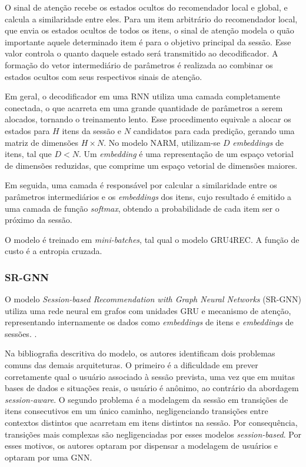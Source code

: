 O sinal de atenção recebe os estados ocultos do recomendador local e global, e
calcula a similaridade entre eles. Para um item arbitrário do recomendador local, que envia os estados ocultos de
todos os itens, o sinal de atenção modela o quão importante aquele determinado
item é para o objetivo principal da sessão. Esse valor controla o quanto daquele
estado será transmitido ao decodificador. A formação do vetor intermediário de
parâmetros é realizada ao combinar os estados ocultos com seus respectivos
sinais de atenção.

Em geral, o decodificador em uma RNN utiliza uma camada completamente conectada,
o que acarreta em uma grande quantidade de parâmetros a serem alocados, tornando
o treinamento lento. Esse procedimento equivale a alocar os estados para $H$
itens da sessão e $N$ candidatos para cada predição, gerando uma matriz de
dimensões ${H \times N}$. No modelo NARM, utilizam-se $D$ \textit{embeddings} de
itens, tal que $D < N$. Um \textit{embedding} é uma representação de um espaço
vetorial de dimensões reduzidas, que comprime um espaço vetorial de dimensões
maiores.

Em seguida, uma camada é responsável por calcular a
similaridade entre os parâmetros intermediários e os \textit{embeddings} dos
itens, cujo resultado é emitido a uma camada de função \textit{softmax}, obtendo
a probabilidade de cada item ser o próximo da sessão.

O modelo é treinado em \textit{mini-batches}, tal qual o modelo GRU4REC. A
função de custo é a entropia cruzada.


\subsubsection{SR-GNN}
O modelo \textit{Session-based Recommendation with Graph Neural Networks}
(SR-GNN) utiliza uma rede neural em grafos com unidades GRU e mecanismo de
atenção, representando internamente os dados como \textit{embeddings} de itens
e \textit{embeddings} de sessões. \cite{gnn}.

Na bibliografia descritiva do modelo, os autores identificam dois problemas
comuns das demais arquiteturas. O primeiro é a dificuldade em prever
corretamente qual o usuário associado à sessão prevista, uma vez que em muitas
bases de dados e situações reais, o usuário é anônimo, ao contrário da abordagem
\textit{session-aware}. O segundo problema é a modelagem da sessão em transições
de itens consecutivos em um único caminho, negligenciando transições entre
contextos distintos que acarretam em itens distintos na sessão. Por
consequência, transições mais complexas são negligenciadas por esses modelos
\textit{session-based}. Por esses motivos, os autores optaram por dispensar a
modelagem de usuários e optaram por uma GNN.

